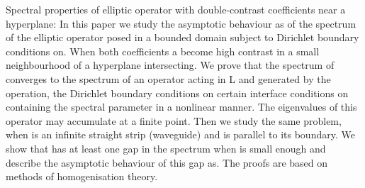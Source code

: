Spectral properties of elliptic operator with double-contrast coefficients near a hyperplane: In this paper we study the asymptotic behaviour as of the spectrum of the elliptic operator posed in a bounded domain subject to Dirichlet boundary conditions on. When both coefficients a become high contrast in a small neighbourhood of a hyperplane intersecting. We prove that the spectrum of converges to the spectrum of an operator acting in L and generated by the operation, the Dirichlet boundary conditions on certain interface conditions on containing the spectral parameter in a nonlinear manner. The eigenvalues of this operator may accumulate at a finite point. Then we study the same problem, when is an infinite straight strip (waveguide) and is parallel to its boundary. We show that has at least one gap in the spectrum when is small enough and describe the asymptotic behaviour of this gap as. The proofs are based on methods of homogenisation theory.